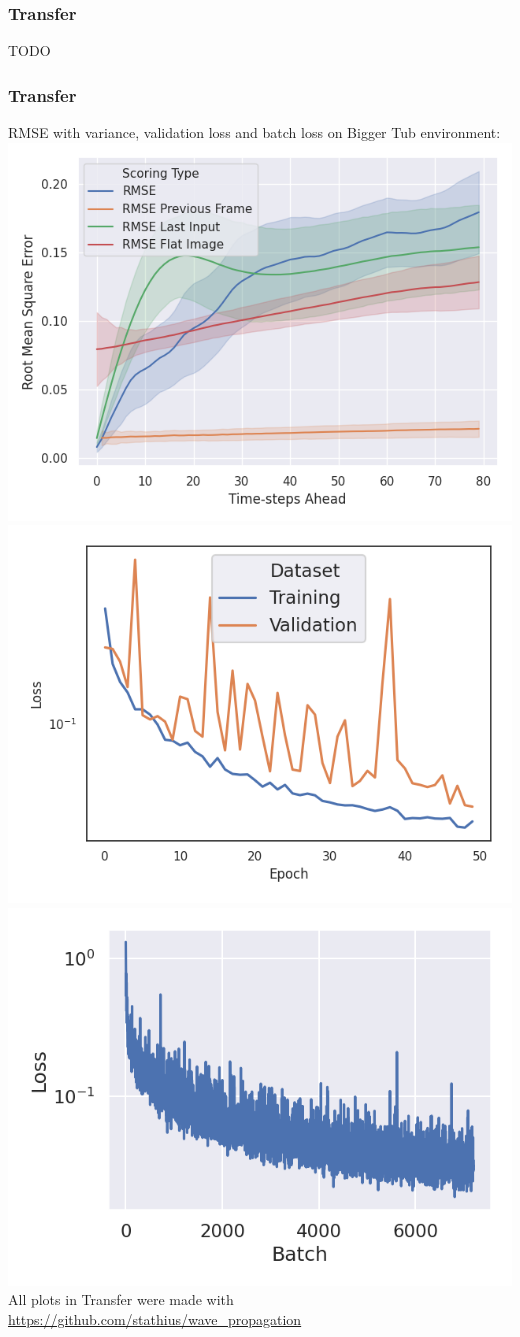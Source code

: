 \begin{frame}
    \frametitle{Transfer}

TODO

\end{frame}
\clearpage

\begin{frame}
    \frametitle{Transfer}

RMSE with variance, validation loss and batch loss on Bigger Tub environment:\\[\baselineskip]

\mbox{\includegraphics[height=.5\paperheight, width=.33\textwidth]{./Ressourcen/Praesentation/Bilder/WaveTransfer/DFP/Bigger_Tub_RMSE_Quality_start_15.png}}%
\mbox{\includegraphics[height=.5\paperheight, width=.33\textwidth]{./Ressourcen/Praesentation/Bilder/WaveTransfer/DFP/Validation_Loss.png}}
\mbox{\includegraphics[height=.5\paperheight, width=.33\textwidth]{./Ressourcen/Praesentation/Bilder/WaveTransfer/DFP/Batch_Loss.png}}
All plots in Transfer were made with \url{https://github.com/stathius/wave_propagation}
\end{frame}
\clearpage

